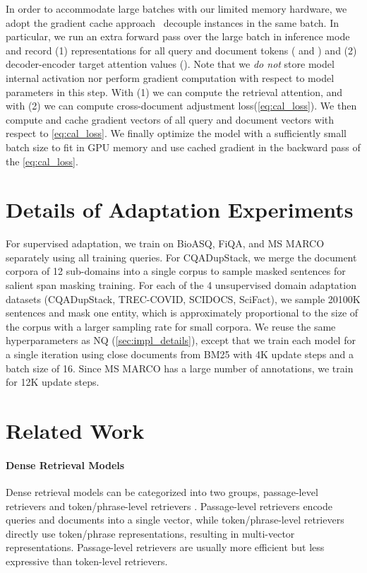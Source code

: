 \documentclass[11pt, dvipsnames]{article}
\newcommand{\adjustloss}{cross-document adjustment loss\xspace}
\newcommand{\msm}{MS MARCO\xspace}
\begin{document}
In order to accommodate large batches with our limited memory hardware, we adopt the gradient cache approach~\cite{gao-etal-2021-scaling} decouple instances in the same batch. In particular, we run an extra forward pass over the large batch in inference mode and record (1) representations for all query and document tokens ( and ) and (2) decoder-encoder target attention values (). Note that we \emph{do not} store model internal activation nor perform gradient computation with respect to model parameters in this step. With (1) we can compute the retrieval attention, and with (2) we can compute \adjustloss (\autoref{eq:cal_loss}). We then compute and cache gradient vectors of all query and document vectors with respect to \autoref{eq:cal_loss}. We finally optimize the model with a sufficiently small batch size to fit in GPU memory and use cached gradient in the backward pass of the \autoref{eq:cal_loss}.

\section{Details of Adaptation Experiments}\label{app:adapt_detail}
For supervised adaptation, we train on BioASQ, FiQA, and \msm separately using all training queries.
For CQADupStack, we merge the document corpora of 12 sub-domains into a single corpus to sample masked sentences for salient span masking training.
For each of the 4 unsupervised domain adaptation datasets (CQADupStack, TREC-COVID, SCIDOCS, SciFact), we sample 20100K sentences and mask one entity, which is approximately proportional to the size of the corpus with a larger sampling rate for small corpora.
We reuse the same hyperparameters as NQ (\autoref{sec:impl_details}), except that we train each model for a single iteration using close documents from BM25 with 4K update steps and a batch size of 16.
Since \msm has a large number of annotations, we train for 12K update steps.

\section{Related Work}\label{app:related_work}
\paragraph{Dense Retrieval Models}
Dense retrieval models can be categorized into two groups, passage-level retrievers \cite{dpr-2020-karpukhin,dpr-paq-2021-oguz,ance-2021-xiong,cocondenser-2022-gao} and token/phrase-level retrievers \cite{colbert-2020-khattab,colbertnq-2020-khattab,coil-2021-gao,densephraseret-2021-lee}.
Passage-level retrievers encode queries and documents into a single vector, while token/phrase-level retrievers directly use token/phrase representations, resulting in multi-vector representations.
Passage-level retrievers are usually more efficient but less expressive than token-level retrievers.
\end{document}
